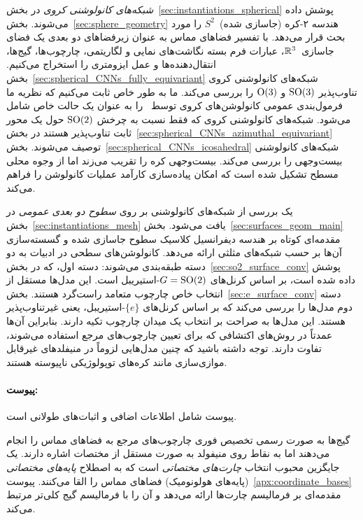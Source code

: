 \emph{شبکه‌های کانولوشنی کروی} در بخش~\ref{sec:instantiations_spherical} پوشش داده می‌شوند.
بخش~\ref{sec:sphere_geometry} هندسه ۲-کره (جاسازی شده)~$S^2$ را مورد بحث قرار می‌دهد.
با تفسیر فضاهای مماس به عنوان زیرفضاهای دو بعدی یک فضای جاسازی~$\mathbb{R}^3$، عبارات فرم بسته نگاشت‌های نمایی و لگاریتمی، چارچوب‌ها، گیج‌ها، انتقال‌دهنده‌ها و عمل ایزومتری را استخراج می‌کنیم.
بخش~\ref{sec:spherical_CNNs_fully_equivariant} شبکه‌های کانولوشنی کروی تناوب‌پذیر $\operatorname{SO}(3)$ و $\operatorname{O}(3)$ را بررسی می‌کند.
ما به طور خاص ثابت می‌کنیم که نظریه ما فرمول‌بندی عمومی کانولوشن‌های کروی توسط~\citet{Cohen2019-generaltheory} را به عنوان یک حالت خاص شامل می‌شود.
شبکه‌های کانولوشنی کروی که فقط نسبت به چرخش $\operatorname{SO}(2)$ حول یک محور ثابت تناوب‌پذیر هستند در بخش~\ref{sec:spherical_CNNs_azimuthal_equivariant} توصیف می‌شوند.
بخش~\ref{sec:spherical_CNNs_icosahedral} شبکه‌های کانولوشنی بیست‌وجهی را بررسی می‌کند.
بیست‌وجهی کره را تقریب می‌زند اما از وجوه محلی مسطح تشکیل شده است که امکان پیاده‌سازی کارآمد عملیات کانولوشن را فراهم می‌کند.

یک بررسی از شبکه‌های کانولوشنی بر روی \emph{سطوح دو بعدی عمومی} در بخش~\ref{sec:instantiations_mesh} یافت می‌شود.
بخش~\ref{sec:surfaces_geom_main} مقدمه‌ای کوتاه بر هندسه دیفرانسیل کلاسیک سطوح جاسازی شده و گسسته‌سازی آن‌ها بر حسب شبکه‌های مثلثی ارائه می‌دهد.
کانولوشن‌های سطحی در ادبیات به دو دسته طبقه‌بندی می‌شوند:
دسته اول، که در بخش~\ref{sec:so2_surface_conv} پوشش داده شده است، بر اساس کرنل‌های $G=\operatorname{SO}(2)$-استیریبل است.
این مدل‌ها مستقل از انتخاب خاص چارچوب متعامد راست‌گرد هستند.
بخش~\ref{sec:e_surface_conv} دسته دوم مدل‌ها را بررسی می‌کند که بر اساس کرنل‌های $\{e\}$-استیریبل، یعنی غیرتناوب‌پذیر هستند.
این مدل‌ها به صراحت بر انتخاب یک میدان چارچوب تکیه دارند.
بنابراین آن‌ها عمدتاً در روش‌های اکتشافی که برای تعیین چارچوب‌های مرجع استفاده می‌شوند، تفاوت دارند.
توجه داشته باشید که چنین مدل‌هایی لزوماً در منیفلدهای غیرقابل موازی‌سازی مانند کره‌های توپولوژیکی ناپیوسته هستند.


\paragraph{پیوست:}

پیوست شامل اطلاعات اضافی و اثبات‌های طولانی است.

گیج‌ها به صورت رسمی تخصیص فوری چارچوب‌های مرجع به فضاهای مماس را انجام می‌دهند اما به نقاط روی منیفولد به صورت مستقل از مختصات اشاره دارند.
یک جایگزین محبوب انتخاب \emph{چارت‌های مختصاتی} است که به اصطلاح \emph{پایه‌های مختصاتی} (پایه‌های هولونومیک) فضاهای مماس را القا می‌کنند.
پیوست~\ref{apx:coordinate_bases} مقدمه‌ای بر فرمالیسم چارت‌ها ارائه می‌دهد و آن را با فرمالیسم گیج کلی‌تر مرتبط می‌کند.

